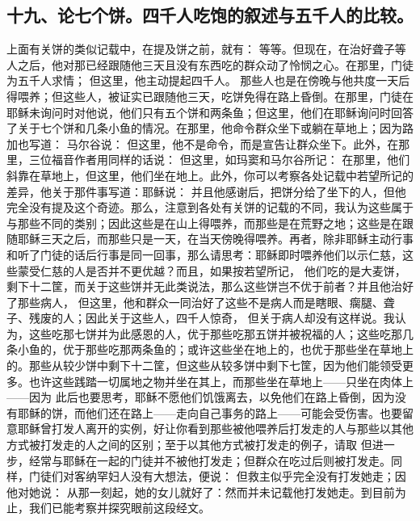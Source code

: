
\subsection{十九、论七个饼。四千人吃饱的叙述与五千人的比较。}

  上面有关饼的类似记载中，在提及饼之前，就有：  等等。但现在，在治好聋子等人之后，他对那已经跟随他三天且没有东西吃的群众动了怜悯之心。在那里，门徒为五千人求情； 但这里，他主动提起四千人。 那些人也是在傍晚与他共度一天后得喂养；但这些人，被证实已跟随他三天，吃饼免得在路上昏倒。在那里，门徒在耶稣未询问时对他说，他们只有五个饼和两条鱼；但这里，他们在耶稣询问时回答了关于七个饼和几条小鱼的情况。在那里，他命令群众坐下或躺在草地上；因为路加也写道： 马尔谷说： 但这里，他不是命令，而是宣告让群众坐下。此外，在那里，三位福音作者用同样的话说： 但这里，如玛窦和马尔谷所记： 在那里，他们斜靠在草地上，但这里，他们坐在地上。此外，你可以考察各处记载中若望所记的差异，他关于那件事写道：耶稣说： 并且他感谢后，把饼分给了坐下的人，但他完全没有提及这个奇迹。那么，注意到各处有关饼的记载的不同，我认为这些属于与那些不同的类别；因此这些是在山上得喂养，而那些是在荒野之地；这些是在跟随耶稣三天之后，而那些只是一天，在当天傍晚得喂养。再者，除非耶稣主动行事和听了门徒的话后行事是同一回事，那么请思考：耶稣即时喂养他们以示仁慈，这些蒙受仁慈的人是否并不更优越？而且，如果按若望所记， 他们吃的是大麦饼，剩下十二筐，而关于这些饼并无此类说法，那么这些饼岂不优于前者？并且他治好了那些病人， 但这里，他和群众一同治好了这些不是病人而是瞎眼、瘸腿、聋子、残废的人；因此关于这些人，四千人惊奇， 但关于病人却没有这样说。我认为，这些吃那七饼并为此感恩的人，优于那些吃那五饼并被祝福的人；这些吃那几条小鱼的，优于那些吃那两条鱼的；或许这些坐在地上的，也优于那些坐在草地上的。那些从较少饼中剩下十二筐，但这些从较多饼中剩下七筐，因为他们能领受更多。也许这些践踏一切属地之物并坐在其上，而那些坐在草地上——只坐在肉体上——因为 此后也要思考，耶稣不愿他们饥饿离去，以免他们在路上昏倒，因为没有耶稣的饼，而他们还在路上——走向自己事务的路上——可能会受伤害。也要留意耶稣曾打发人离开的实例，好让你看到那些被他喂养后打发走的人与那些以其他方式被打发走的人之间的区别；至于以其他方式被打发走的例子，请取 但进一步，经常与耶稣在一起的门徒并不被他打发走；但群众在吃过后则被打发走。同样，门徒们对客纳罕妇人没有大想法，便说： 但救主似乎完全没有打发她走；因他对她说： 从那一刻起，她的女儿就好了：然而并未记载他打发她走。到目前为止，我们已能考察并探究眼前这段经文。\par

